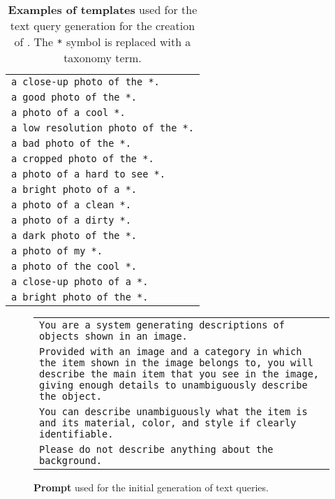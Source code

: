 \begin{table}[t]
    \centering
    \begin{tabular}{l}
        \texttt{a close-up photo of the *.}\\
        \texttt{a good photo of the *.}\\
        \texttt{a photo of a cool *.}\\
        \texttt{a low resolution photo of the *.}\\
        \texttt{a bad photo of the *.}\\
        \texttt{a cropped photo of the *.}\\
        \texttt{a photo of a hard to see *.}\\
        \texttt{a bright photo of a *.}\\
        \texttt{a photo of a clean *.}\\
        \texttt{a photo of a dirty *.}\\
        \texttt{a dark photo of the *.}\\
        \texttt{a photo of my *.}\\
        \texttt{a photo of the cool *.}\\
        \texttt{a close-up photo of a *.}\\
        \texttt{a bright photo of the *.}
    \end{tabular}
    \vspace{-6pt}
    \caption{\textbf{Examples of templates} used for the text query generation for the creation of \miniours. The \texttt{*} symbol is replaced with a taxonomy term.
    \label{tab:templates}
    \vspace{-6pt}
    }
\end{table}

\begin{figure}[t]
    \centering
    \begin{tcolorbox}[colback=gray!15, colframe=black, width=\linewidth]
        \hspace{-8pt}
        \begin{tabular}{p{1.03\linewidth}}
            {\scriptsize \texttt{You are a system generating descriptions of objects shown in an image.}} \\
            {\scriptsize \texttt{Provided with an image and a category in which the item shown in the image belongs to, you will describe the main item that you see in the image, giving enough details to unambiguously describe the object.}} \\
            {\scriptsize \texttt{You can describe unambiguously what the item is and its material, color, and style if clearly identifiable.}} \\
            {\scriptsize \texttt{Please do not describe anything about the background.}}
        \end{tabular}
    \end{tcolorbox}
    \vspace{-6pt}
    \caption{\textbf{Prompt} used for the initial generation of text queries.
    \label{fig:chagpt_prompt}
    }
\end{figure}

